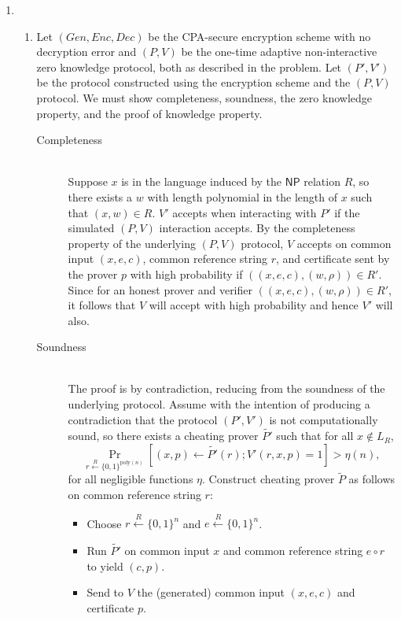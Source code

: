 \documentclass[draft]{article}
\newcommand{\class}[1]{{\ensuremath{\mathsf{#1}}}}
\newcommand{\NP}{\class{NP}}
\newcommand{\poly}{\textrm{poly}}
\newcommand{\getr}{\overset{R}{\gets}}
\begin{document}
\begin{enumerate}
\item
  \begin{enumerate}
  \item
    Let $(Gen, Enc, Dec)$ be the CPA-secure encryption scheme with no decryption error and $(P, V)$ be the one-time adaptive non-interactive zero knowledge protocol, both as described in the problem.
    Let $(P', V')$ be the protocol constructed using the encryption scheme and the $(P, V)$ protocol.
    We must show completeness, soundness, the zero knowledge property, and the proof of knowledge property.
    \begin{description}
    \item[Completeness] \hfill \\
      Suppose $x$ is in the language induced by the $\NP$ relation $R$, so there exists a $w$ with length polynomial in the length of $x$ such that $(x,w)\in R$.
      $V'$ accepts when interacting with $P'$ if the simulated $(P, V)$ interaction accepts.
      By the completeness property of the underlying $(P, V)$ protocol, $V$ accepts on common input $(x, e, c)$, common reference string $r$, and certificate sent by the prover $p$ with high probability if $((x, e, c), (w, \rho))\in R'$.
      Since for an honest prover and verifier $((x, e, c), (w, \rho))\in R'$, it follows that $V$ will accept with high probability and hence $V'$ will also.
    \item[Soundness] \hfill \\
      The proof is by contradiction, reducing from the soundness of the underlying protocol.
      Assume with the intention of producing a contradiction that the protocol $(P', V')$ is not computationally sound, so there exists a cheating prover $\tilde{P'}$ such that for all $x\notin L_R$,
      \begin{displaymath}
        \Pr_{r\getr\{0,1\}^{\poly(n)}}[(x, p)\gets\tilde{P'}(r); V'(r, x, p)=1]>\eta(n),
      \end{displaymath}
      for all negligible functions $\eta$.
      Construct cheating prover $\tilde{P}$ as follows on common reference string $r$:
      \begin{itemize}
      \item Choose $r\getr\{0,1\}^n$ and $e\getr\{0,1\}^n$.
      \item Run $\tilde{P'}$ on common input $x$ and common reference string $e\circ r$ to yield $(c, p)$.
      \item Send to $V$ the (generated) common input $(x, e, c)$ and certificate $p$.
      \end{itemize}


\end{description}
\end{enumerate}
\end{enumerate}
\end{document}
